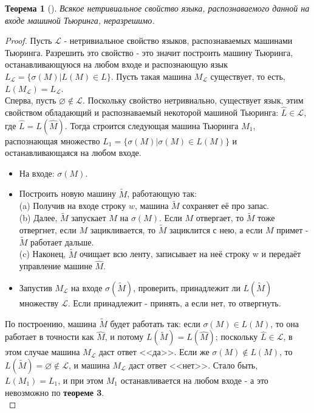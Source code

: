 \documentclass[a4paper]{article}
\theoremstyle{indented}
\newtheorem{theorem}{Теорема}
\theoremstyle{definition}
\theoremstyle{remark}
\begin{document}
\begin{theorem}[]
    Всякое нетривиальное свойство языка, распознаваемого данной на входе машиной Тьюринга, неразрешимо.
\end{theorem}

\begin{proof}
    Пусть $\mathcal{L}$ - нетривиальное свойство языков, распознаваемых машинами Тьюринга. Разрешить это свойство - это значит построить машину Тьюринга, останавливающуюся на любом входе и распознающую язык $L_{\mathcal{L}} = \{\sigma(M) | L(M) \in L\}$. Пусть такая машина $M_{\mathcal{L}}$ существует, то есть, $L(M_{\mathcal{L}}) = L_{\mathcal{L}}$. \\ 

    Сперва, пусть $\varnothing \notin \mathcal{L}$. Поскольку свойство нетривиально, существует язык, этим свойством обладающий и распознаваемый некоторой машиной Тьюринга: $\widehat{L} \in \mathcal{L}$, где $\widehat{L} = L(\widehat{M})$. Тогда строится следующая машина Тьюринга $M_1$, распознающая множество $L_1 = \{\sigma(M) | \sigma(M ) \in L(M ) \}$ и останавливающаяся на любом входе.

    \begin{itemize}
        \item На входе: $\sigma(M)$.
        \item Построить новую машину $\widetilde{M}$, работающую так: \\

        (a) Получив на входе строку $w$, машина $\widetilde{M}$ сохраняет её про запас. \\

        (b) Далее, $\widetilde{M}$ запускает $M$ на $\sigma(M)$. Если $M$ отвергает, то $\widetilde{M}$ тоже отвергнет, если $M$ зацикливается, то $\widetilde{M}$ зациклится с нею, а если $M$ примет - $\widetilde{M}$ работает дальше. \\ 

        (c) Наконец, $\widetilde{M}$ очищает всю ленту, записывает на неё строку w и передаёт управление машине $\widehat{M}$.

        \item Запустив $M_{\mathcal{L}}$ на входе $\sigma(\widetilde{M})$, проверить, принадлежит ли $L(\widetilde{M})$ множеству $\mathcal{L}$. Если принадлежит - принять, а если нет, то отвергнуть. 
    \end{itemize}

    По построению, машина $\widetilde{M}$ будет работать так: если $\sigma(M) \in L(M)$, то она работает в точности как $\widehat{M}$, и потому $L(\widetilde{M}) = L(\widehat{M})$; поскольку $\widehat{L} \in \mathcal{L}$, в этом случае машина $M_{\mathcal{L}}$ даст ответ <<да>>. Если же $\sigma(M) \notin L(M)$, то $L(\widetilde{M}) = \varnothing \notin \mathcal{L}$, и машина $M_{\mathcal{L}}$ даст ответ <<нет>>. Стало быть, $L(M_1) = L_1$, и при этом $M_1$ останавливается на любом входе - а это невозможно по \textbf{теореме 3}. \\


\end{proof}
\end{document}
